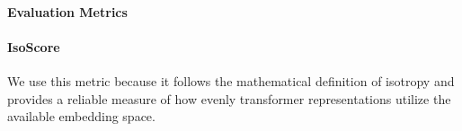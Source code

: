 
\paragraph{Evaluation Metrics}


\paragraph{IsoScore}
We use this metric because it follows the mathematical definition of isotropy and provides a reliable measure of how evenly transformer representations utilize the available embedding space.

